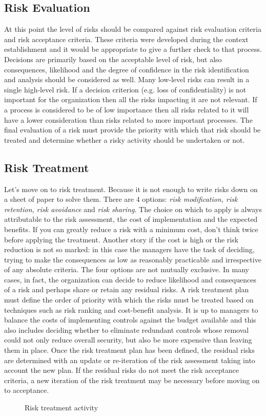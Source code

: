 \subsection{Risk Evaluation}
At this point the level of risks should be compared against risk evaluation criteria and risk acceptance criteria. These criteria were developed during the context establishment and it would be appropriate to give a further check to that process. Decisions are primarily based on the acceptable level of risk, but also consequences, likelihood and the degree of confidence in the risk identification and analysis should be considered as well. Many low-level risks can result in a single high-level risk. If a decision criterion (e.g. loss of confidentiality) is not important for the organization then all the risks impacting it are not relevant. If a process is considered to be of low importance then all risks related to it will have a lower consideration than risks related to more important processes. The final evaluation of a risk must provide the priority with which that risk should be treated and determine whether a risky activity should be undertaken or not.
\subsection{Risk Treatment}
Let's move on to risk treatment. Because it is not enough to write risks down on a sheet of paper to solve them. There are 4 options: \textit{risk modification, risk retention, risk avoidance} and \textit{risk sharing}. The choice on which to apply is always attributable to the risk assessment, the cost of implementation and the expected benefits. If you can greatly reduce a risk with a minimum cost, don't think twice before applying the treatment. Another story if the cost is high or the risk reduction is not so marked: in this case the managers have the task of deciding, trying to make the consequences as low as reasonably practicable and irrespective of any absolute criteria. The four options are not mutually exclusive. In many cases, in fact, the organization can decide to reduce likelihood and consequences of a risk and perhaps share or retain any residual risks. A risk treatment plan must define the order of priority with which the risks must be treated based on techniques such as risk ranking and cost-benefit analysis. It is up to managers to balance the costs of implementing controls against the budget available and this also includes deciding whether to eliminate redundant controls whose removal could not only reduce overall security, but also be more expensive than leaving them in place. Once the risk treatment plan has been defined, the residual risks are determined with an update or re-iteration of the risk assessment taking into account the new plan. If the residual risks do not meet the risk acceptance criteria, a new iteration of the risk treatment may be necessary before moving on to acceptance.
\begin{figure}[H]
  \centering
  
  \caption{Risk treatment activity}
\end{figure}
\noindent
